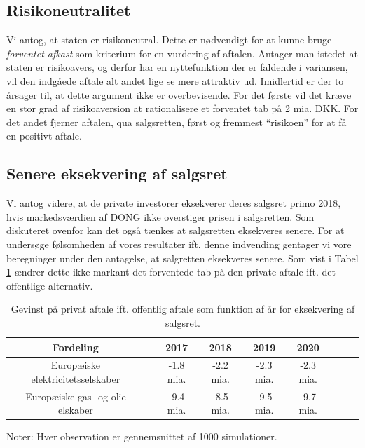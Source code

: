 \documentclass{article}
\begin{document}
\subsection{Risikoneutralitet}

Vi antog, at staten er risikoneutral. Dette er nødvendigt for at kunne bruge \emph{forventet afkast} som kriterium for en vurdering af aftalen. Antager man istedet at staten er risikoavers, og derfor har en nyttefunktion der er faldende i variansen, vil den indgåede aftale alt andet lige se mere attraktiv ud. Imidlertid er der to årsager til, at dette argument ikke er overbevisende. For det første vil det kræve en stor grad af risikoaversion at rationalisere et forventet tab på 2 mia. DKK. For det andet fjerner aftalen, qua salgsretten, først og fremmest \enquote{risikoen} for at få en positivt aftale. 

\subsection{Senere eksekvering af salgsret}

Vi antog videre, at de private investorer eksekverer deres salgsret primo 2018, hvis markedsværdien af DONG ikke overstiger prisen i salgsretten. Som diskuteret ovenfor kan det også tænkes at salgsretten eksekveres senere. For at undersøge følsomheden af vores resultater ift. denne indvending gentager vi vore beregninger under den antagelse, at salgretten eksekveres senere. Som vist i Tabel \ref{tab:robust_aar} ændrer dette ikke markant det forventede tab på den private aftale ift. det offentlige alternativ.

\begin{table}[h]
	\caption{Gevinst på privat aftale ift. offentlig aftale som funktion af \aa{}r for eksekvering af salgsret.}  
	\label{tab:robust_aar}
	\begin{tabularx}{\linewidth}{cXccccccr}
	\toprule[1pt]
	Fordeling && 2017 & 2018 & 2019 & 2020 \\
	\hline 
		Europ\ae{}iske elektricitetsselskaber && -1.8 mia. & -2.2 mia. & -2.3 mia. & -2.3 mia. \\
	Europ\ae{}iske gas- og olie elskaber && -9.4 mia. & -8.5 mia. & -9.5 mia.  &  -9.7 mia.  \\
		\bottomrule[1pt]
	\end{tabularx}
	\begin{minipage}{\linewidth}
		\footnotesize{Noter: Hver observation er gennemsnittet af 1000 simulationer.}
	\end{minipage}
\end{table}




\FloatBarrier




\newpage



\end{document}
